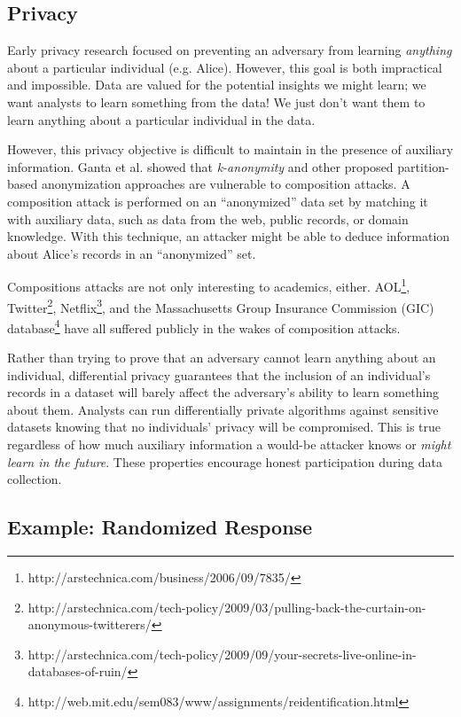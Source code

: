 \documentclass[12pt]{report}
\begin{document}
\subsection{Privacy}\label{subsec:intro-almostperfectpriv}

Early privacy research focused on preventing an adversary from learning \textit{anything} about a particular individual (e.g. Alice).
However, this goal is both impractical and impossible.
Data are valued for the potential insights we might learn;
we want analysts to learn something from the data!
We just don't want them to learn anything about a particular individual in the data.

However, this privacy objective is difficult to maintain in the presence of auxiliary information.
Ganta et al. showed that \textit{k-anonymity} and other proposed partition-based anonymization approaches are vulnerable to composition attacks\cite{ganta2008composition}.
A composition attack is performed on an ``anonymized'' data set by matching it with auxiliary data, such as data from the web, public records, or domain knowledge.
With this technique, an attacker might be able to deduce information about Alice's records in an ``anonymized'' set.

Compositions attacks are not only interesting to academics, either.
AOL\footnote{\label{fn:aol} http://arstechnica.com/business/2006/09/7835/}, Twitter\footnote{\label{fn:twitter}http://arstechnica.com/tech-policy/2009/03/pulling-back-the-curtain-on-anonymous-twitterers/}, Netflix\footnote{\label{fn:netflix}http://arstechnica.com/tech-policy/2009/09/your-secrets-live-online-in-databases-of-ruin/}, and the Massachusetts Group Insurance Commission (GIC) database\footnote{\label{fn:gic}http://web.mit.edu/sem083/www/assignments/reidentification.html} have all suffered publicly in the wakes of composition attacks.

Rather than trying to prove that an adversary cannot learn anything about an individual, differential privacy guarantees that the inclusion of an individual's records in a dataset will barely affect the adversary's ability to learn something about them.
Analysts can run differentially private algorithms against sensitive datasets knowing that no individuals' privacy will be compromised.
This is true regardless of how much auxiliary information a would-be attacker knows or \textit{might learn in the future}\cite{journals/cacm/Dwork11}.
These properties encourage honest participation during data collection.

\subsection{Example: Randomized Response}
\end{document}

